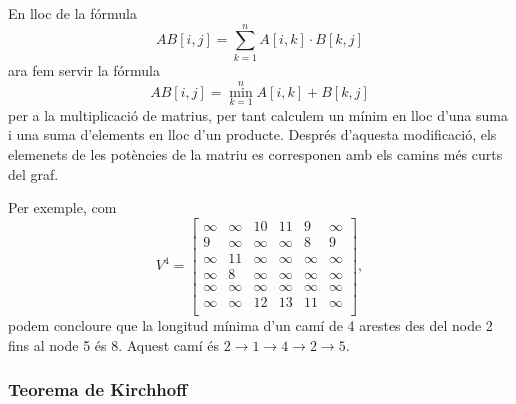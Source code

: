 En lloc de la fórmula
\[
AB[i,j] = \sum_{k=1}^n A[i,k] \cdot B[k,j]
\]
ara fem servir la fórmula
\[
AB[i,j] = \min_{k=1}^n A[i,k] + B[k,j]
\]
per a la multiplicació de matrius, per tant calculem un mínim en lloc
d'una suma i una suma d'elements en lloc d'un producte. Després
d'aquesta modificació, els elemenets de les potències de la matriu es
corresponen amb els camins més curts del graf.

Per exemple, com
\[
V^4= \begin{bmatrix}
  \infty & \infty & 10 & 11 & 9 & \infty \\
  9 & \infty & \infty & \infty & 8 & 9 \\
  \infty & 11 & \infty & \infty & \infty & \infty \\
  \infty & 8 & \infty & \infty & \infty & \infty \\
  \infty & \infty & \infty & \infty & \infty & \infty \\
  \infty & \infty & 12 & 13 & 11 & \infty \\
 \end{bmatrix},
\]
podem concloure que la longitud mínima d'un camí de 4 arestes des del
node 2 fins al node 5 és 8. Aquest camí és $2 \rightarrow 1
\rightarrow 4 \rightarrow 2 \rightarrow 5$.

\subsubsection{Teorema de Kirchhoff}

 


